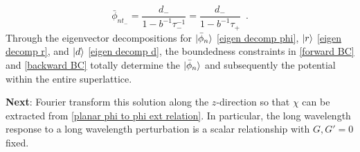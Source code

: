 \documentclass[submission, Phys]{SciPost}
\DeclarePairedDelimiter\ket{\lvert}{\rangle}
\newcommand{\note}[1]{{\bf \color{red} #1}}
\begin{document}
\begin{equation}
    \label{backward BC}
    \bar\phi_{nt_-} = \frac{d_-}{1-b^{-1}\tau_-^{-1}} = \frac{d_-}{1-b^{-1}\tau_+}
    \,\,\,.
\end{equation}
Through the eigenvector decompositions for $\ket{\bar\phi_n}$ \eqref{eigen decomp phi}, $\ket r$ \eqref{eigen decomp r}, and $\ket d$ \eqref{eigen decomp d}, the boundedness constraints in \eqref{forward BC} and \eqref{backward BC} totally determine the $\ket{\bar\phi_n}$ and subsequently the potential within the entire superlattice.

\note{Next}: Fourier transform this solution along the $z$-direction so that $\chi$ can be extracted from \eqref{planar phi to phi ext relation}.  In particular, the long wavelength response to a long wavelength perturbation is a scalar relationship with $G,G'=0$ fixed.
\end{document}
